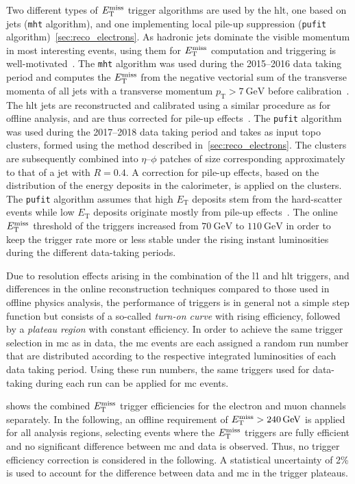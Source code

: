 Two different types of $E_{\textrm{T}}^{\textrm{miss}}$ trigger algorithms are used by the \gls{hlt}, one based on jets (\texttt{mht} algorithm), and one implementing local pile-up suppression (\texttt{pufit} algorithm)~\cref{sec:reco_electrons}.
As hadronic jets dominate the visible momentum in most interesting events, using them for $E_{\textrm{T}}^{\textrm{miss}}$ computation and triggering is well-motivated~\cite{Aad:2020les}.
The \texttt{mht} algorithm was used during the 2015--2016 data taking period and computes the $E_{\textrm{T}}^{\textrm{miss}}$ from the negative vectorial sum of the transverse momenta of all jets with a transverse momentum $p_\mathrm{T} > \SI{7}{\GeV}$ before calibration~\cite{Aad:2020les}.
The \gls{hlt} jets are reconstructed and calibrated using a similar procedure as for offline analysis, and are thus corrected for pile-up effects~\cite{Aad:2016nrq}.
The \texttt{pufit} algorithm was used during the 2017--2018 data taking period and takes as input topo clusters, formed using the method described in~\cref{sec:reco_electrons}.
The clusters are subsequently combined into $\eta$--$\phi$ patches of size corresponding approximately to that of a jet with $R=0.4$. A correction for pile-up effects, based on the distribution of the energy deposits in the calorimeter, is applied on the clusters.
The \texttt{pufit} algorithm assumes that high $E_\mathrm{T}$ deposits stem from the hard-scatter events while low $E_\mathrm{T}$ deposits originate mostly from pile-up effects~\cite{Aad:2020les}.
The online $E_{\textrm{T}}^{\textrm{miss}}$ threshold of the triggers increased from $\SI{70}{\GeV}$ to $\SI{110}{\GeV}$ in order to keep the trigger rate more or less stable under the rising instant luminosities during the different data-taking periods.  

Due to resolution effects arising in the combination of the \gls{l1} and \gls{hlt} triggers, and differences in the online reconstruction techniques compared to those used in offline physics analysis, the performance of triggers is in general not a simple step function but consists of a so-called \textit{turn-on curve} with rising efficiency, followed by a \textit{plateau region} with constant efficiency.
In order to achieve the same trigger selection in \gls{mc} as in data, the \gls{mc} events are each assigned a random run number that are distributed according to the respective integrated luminosities of each data taking period.
Using these run numbers, the same triggers used for data-taking during each run can be applied for \gls{mc} events. 

 shows the combined $E_{\textrm{T}}^{\textrm{miss}}$ trigger efficiencies for the electron and muon channels separately.
In the following, an offline requirement of $\etmiss > \SI{240}{\GeV}$ is applied for all analysis regions, selecting events where the $E_{\textrm{T}}^{\textrm{miss}}$ triggers are fully efficient and no significant difference between \gls{mc} and data is observed.
Thus, no trigger efficiency correction is considered in the following. A statistical uncertainty of 2\% is used to account for the difference between data and \gls{mc} in the trigger plateaus.


